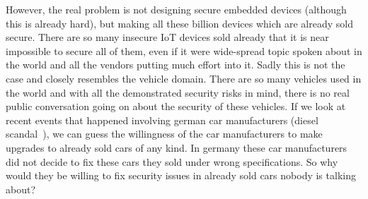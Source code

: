 However, the real problem is not designing secure embedded devices (although this is already hard), but making all these billion devices which are already sold secure. There are so many insecure IoT devices sold already that it is near impossible to secure all of them, even if it were wide-spread topic spoken about in the world and all the vendors putting much effort into it. Sadly this is not the case and closely resembles the vehicle domain. There are so many vehicles used in the world and with all the demonstrated security risks in mind, there is no real public conversation going on about the security of these vehicles. If we look at recent events that happened involving german car manufacturers (diesel scandal~\cite{spiegel17}), we can guess the willingness of the car manufacturers to make upgrades to already sold cars of any kind. In germany these car manufacturers did not decide to fix these cars they sold under wrong specifications. So why would they be willing to fix security issues in already sold cars nobody is talking about?

